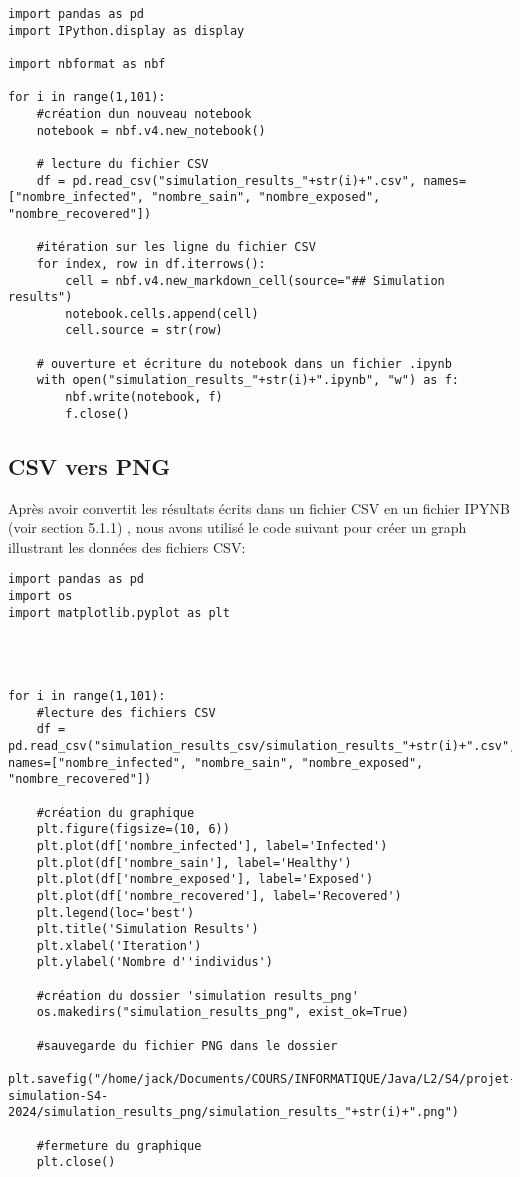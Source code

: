 \documentclass[french]{article}
\begin{document}
\begin{lstlisting}
import pandas as pd
import IPython.display as display

import nbformat as nbf

for i in range(1,101):
    #création dun nouveau notebook
    notebook = nbf.v4.new_notebook()

    # lecture du fichier CSV
    df = pd.read_csv("simulation_results_"+str(i)+".csv", names=["nombre_infected", "nombre_sain", "nombre_exposed", "nombre_recovered"])
	
	#itération sur les ligne du fichier CSV
    for index, row in df.iterrows():
        cell = nbf.v4.new_markdown_cell(source="## Simulation results")
        notebook.cells.append(cell)
        cell.source = str(row)
	
	# ouverture et écriture du notebook dans un fichier .ipynb
    with open("simulation_results_"+str(i)+".ipynb", "w") as f:
        nbf.write(notebook, f)
        f.close()
\end{lstlisting}

\subsection{CSV vers PNG}

Après avoir convertit les résultats écrits dans un fichier CSV en un fichier IPYNB (voir section 5.1.1) , nous avons utilisé le code suivant pour créer un graph illustrant les données des fichiers CSV:\\

\begin{lstlisting}
import pandas as pd
import os
import matplotlib.pyplot as plt




for i in range(1,101):
	#lecture des fichiers CSV
    df = pd.read_csv("simulation_results_csv/simulation_results_"+str(i)+".csv", names=["nombre_infected", "nombre_sain", "nombre_exposed", "nombre_recovered"])
    
    #création du graphique
    plt.figure(figsize=(10, 6))
    plt.plot(df['nombre_infected'], label='Infected')
    plt.plot(df['nombre_sain'], label='Healthy')
    plt.plot(df['nombre_exposed'], label='Exposed')
    plt.plot(df['nombre_recovered'], label='Recovered')
    plt.legend(loc='best')
    plt.title('Simulation Results')
    plt.xlabel('Iteration')
    plt.ylabel('Nombre d''individus')
    
    #création du dossier 'simulation results_png'
    os.makedirs("simulation_results_png", exist_ok=True)
    
    #sauvegarde du fichier PNG dans le dossier
    plt.savefig("/home/jack/Documents/COURS/INFORMATIQUE/Java/L2/S4/projet-simulation-S4-2024/simulation_results_png/simulation_results_"+str(i)+".png")
    
    #fermeture du graphique
    plt.close()
    
\end{lstlisting}
\end{document}
